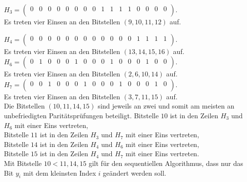 \begin{Beispiel}
    $H_3= \left( \begin{array}{rrrrrrrrrrrrrrrr}
        0 & 0 & 0 & 0 & 0 & 0 & 0 & 0 & 1 & 1 & 1 & 1 & 0 & 0 & 0 & 0 \\
       \end{array}\right). 
    $\\
    Es treten vier Einsen an den Bitstellen $(9, 10, 11, 12)$ auf.\\
    \pagebreak
    
    $H_4= \left( \begin{array}{rrrrrrrrrrrrrrrr}
        0 & 0 & 0 & 0 & 0 & 0 & 0 & 0 & 0 & 0 & 0 & 0 & 1 & 1 & 1 & 1 \\
       \end{array}\right). 
    $\\
    Es treten vier Einsen an den Bitstellen $(13, 14, 15, 16)$ auf.\\
    
    $H_6= \left( \begin{array}{rrrrrrrrrrrrrrrr}
        0 & 1 & 0 & 0 & 0 & 1 & 0 & 0 & 0 & 1 & 0 & 0 & 0 & 1 & 0 & 0 \\
       \end{array}\right). 
    $\\
    Es treten vier Einsen an den Bitstellen $(2, 6, 10, 14)$ auf.\\
    
    $H_7= \left( \begin{array}{rrrrrrrrrrrrrrrr}
        0 & 0 & 1 & 0 & 0 & 0 & 1 & 0 & 0 & 0 & 1 & 0 & 0 & 0 & 1 & 0 \\
       \end{array}\right). 
    $\\
    Es treten vier Einsen an den Bitstellen $(3, 7, 11, 15)$ auf.\\
    
    
    Die Bitstellen $(10, 11, 14, 15)$ sind jeweils an zwei und somit am meisten an unbefriedigten Paritätsprüfungen beteiligt.
    Bitstelle $10$ ist in den Zeilen $H_3$ und $H_6$ mit einer Eins vertreten,\\
    Bitstelle $11$ ist in den Zeilen $H_3$ und $H_7$ mit einer Eins vertreten,\\
    Bitstelle $14$ ist in den Zeilen $H_4$ und $H_6$ mit einer Eins vertreten,\\
    Bitstelle $15$ ist in den Zeilen $H_4$ und $H_7$ mit einer Eins vertreten.\\
    Mit Bitstelle $10 < 11, 14, 15$ gilt für den sequentiellen Algorithmus, dass nur das Bit $y_i$ mit dem kleinsten Index $i$ geändert werden soll.\\
    

\end{Beispiel}
